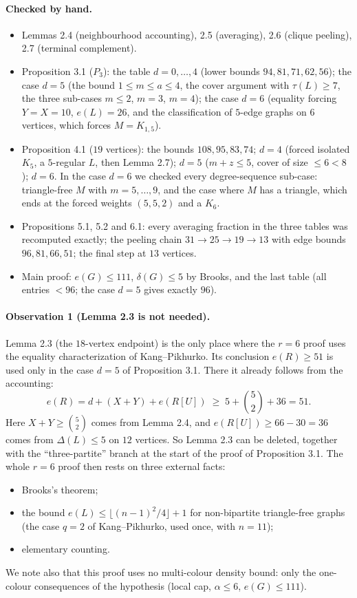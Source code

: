 \documentclass[11pt]{amsart}
\theoremstyle{remark}\newtheorem*{remark}{Remark}
\begin{document}
\paragraph{Checked by hand.}
\begin{itemize}
\item Lemmas 2.4 (neighbourhood accounting), 2.5 (averaging), 2.6 (clique peeling), 2.7 (terminal complement).
\item Proposition 3.1 ($P_3$): the table $d=0,\dots,4$ (lower bounds $94,81,71,62,56$); the case $d=5$ (the bound
  $1\le m\le a\le 4$, the cover argument with $\tau(L)\ge7$, the three sub-cases $m\le2$, $m=3$, $m=4$); the case $d=6$
  (equality forcing $Y=X=10$, $e(L)=26$, and the classification of $5$-edge graphs on $6$ vertices, which forces $M=K_{1,5}$).
\item Proposition 4.1 ($19$ vertices): the bounds $108,95,83,74$; $d=4$ (forced isolated $K_5$, a $5$-regular $L$, then Lemma 2.7);
  $d=5$ ($m+z\le5$, cover of size $\le6<8$); $d=6$. In the case $d=6$ we checked every degree-sequence sub-case:
  triangle-free $M$ with $m=5,\dots,9$, and the case where $M$ has a triangle, which ends at the forced weights $(5,5,2)$ and a $K_6$.
\item Propositions 5.1, 5.2 and 6.1: every averaging fraction in the three tables was recomputed exactly; the peeling chain
  $31\to25\to19\to13$ with edge bounds $96,81,66,51$; the final step at $13$ vertices.
\item Main proof: $e(G)\le111$, $\delta(G)\le5$ by Brooks, and the last table (all entries $<96$; the case $d=5$ gives exactly $96$).
\end{itemize}

\paragraph{Observation 1 (Lemma 2.3 is not needed).}
Lemma 2.3 (the $18$-vertex endpoint) is the only place where the $r=6$ proof uses the equality characterization of Kang--Pikhurko.
Its conclusion $e(R)\ge51$ is used only in the case $d=5$ of Proposition 3.1. There it already follows from the accounting:
\[
 e(R)=d+(X+Y)+e(R[U])\;\ge\;5+\binom52+36=51 .
\]
Here $X+Y\ge\binom52$ comes from Lemma 2.4, and $e(R[U])\ge 66-30=36$ comes from $\Delta(L)\le5$ on $12$ vertices.
So Lemma 2.3 can be deleted, together with the ``three-partite'' branch at the start of the proof of Proposition 3.1. The whole $r=6$ proof then rests on three external facts:
\begin{itemize}
\item Brooks's theorem;
\item the bound $e(L)\le\lfloor (n-1)^2/4\rfloor+1$ for non-bipartite triangle-free graphs (the case $q=2$ of Kang--Pikhurko, used once, with $n=11$);
\item elementary counting.
\end{itemize}
We note also that this proof uses no multi-colour density bound: only the one-colour consequences of the hypothesis
(local cap, $\alpha\le6$, $e(G)\le111$).
\end{document}
